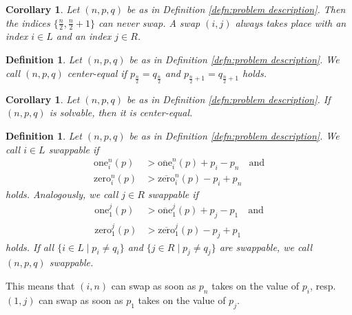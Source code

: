 \documentclass[12pt]{article}
\newtheorem{defn}[thm]{Definition}
\newtheorem{cor}[thm]{Corollary}
\begin{document}
\begin{cor}
Let $(n, p, q)$ be as in Definition \ref{defn:problem description}. Then the indices $\{\frac{n}{2}, \frac{n}{2}+1 \}$ can never swap. A swap $(i, j)$ always takes place with an index $i\in L$ and an index $j\in R$.
\label{cor:swap only from L and R}
\end{cor}

\begin{defn}
Let $(n, p, q)$ be as in Definition \ref{defn:problem description}. We call $(n, p, q)$ \emph{center-equal} if $p_{\frac{n}{2}}=q_{\frac{n}{2}}$ and $p_{\frac{n}{2}+1}=q_{\frac{n}{2}+1}$ holds.
\label{defn:center-equal}
\end{defn}

\begin{cor}
Let $(n, p, q)$ be as in Definition \ref{defn:problem description}. If $(n, p, q)$ is solvable, then it is center-equal.
\label{cor:center invariant}
\end{cor}

\begin{defn}
Let $(n, p, q)$ be as in Definition \ref{defn:problem description}. We call $i\in L$ swappable if
\begin{align}
\mathrm{one}_i^{n}(p)
&> 
\overline{\mathrm{one}}_i^{n}(p)
+
p_i-p_n
\quad\textrm{and}
\label{eq:condition i and n swappable -> ones greater}
\\
\mathrm{zero}_i^{n}(p)
&> 
\overline{\mathrm{zero}}_i^{n}(p)
-
p_i+p_n
\label{eq:condition i and n swappable -> zeros greater}
\end{align}
holds. Analogously, we call $j\in R$ swappable if
\begin{align}
\mathrm{one}_1^{j}(p)
&> 
\overline{\mathrm{one}}_1^{j}(p)
+
p_j-p_1
\quad\textrm{and}
\label{eq:condition 1 and j swappable -> ones greater}
\\
\mathrm{zero}_1^{j}(p)
&> 
\overline{\mathrm{zero}}_1^{j}(p)
-
p_j+p_1
\label{eq:condition 1 and j swappable -> zeros greater}
\end{align}
holds.
If all $\{i\in L \mid p_i\neq q_i\}$ and $\{j\in R \mid p_j\neq q_j\}$ are swappable, we call $(n, p, q)$ swappable.
\end{defn}
\noindent This means that $(i, n)$ can swap as soon as $p_n$ takes on the value of $p_i$, resp.\ $(1, j)$ can swap as soon as $p_1$ takes on the value of $p_j$.
\end{document}
